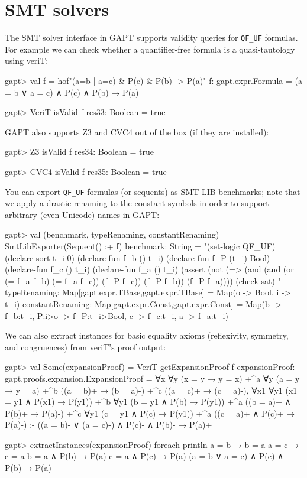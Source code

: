 \documentclass[a4paper,11pt]{book}
\begin{document}
\section{SMT solvers}

The SMT solver interface in GAPT supports validity queries for \verb,QF_UF,
formulas.  For example we can check whether a quantifier-free formula is a
quasi-tautology using veriT:
\begin{clilisting}
gapt> val f = hof"(a=b | a=c) & P(c) & P(b) -> P(a)"
f: gapt.expr.Formula = (a = b ∨ a = c) ∧ P(c) ∧ P(b) → P(a)

\end{clilisting}

\begin{clilisting}
gapt> VeriT isValid f
res33: Boolean = true

\end{clilisting}

GAPT also supports Z3 and CVC4 out of the box (if they are installed):
\begin{clilisting}
gapt> Z3 isValid f
res34: Boolean = true

gapt> CVC4 isValid f
res35: Boolean = true

\end{clilisting}

You can export \verb,QF_UF, formulas (or sequents) as SMT-LIB benchmarks;
note that we apply a drastic renaming to the constant symbols in order to
support arbitrary (even Unicode) names in GAPT:
\begin{clilisting}
gapt> val (benchmark, typeRenaming, constantRenaming) = SmtLibExporter(Sequent() :+ f)
benchmark: String =
"(set-logic QF_UF)
(declare-sort t_i 0)
(declare-fun f_b () t_i)
(declare-fun f_P (t_i) Bool)
(declare-fun f_c () t_i)
(declare-fun f_a () t_i)
(assert (not (=> (and (and (or (= f_a f_b) (= f_a f_c)) (f_P f_c)) (f_P f_b)) (f_P f_a))))
(check-sat)
"
typeRenaming: Map[gapt.expr.TBase,gapt.expr.TBase] = Map(o -> Bool, i -> t_i)
constantRenaming: Map[gapt.expr.Const,gapt.expr.Const] = Map(b -> f_b:t_i, P:i>o -> f_P:t_i>Bool, c -> f_c:t_i, a -> f_a:t_i)

\end{clilisting}

We can also extract instances for basic equality axioms (reflexivity, symmetry,
and congruences) from veriT's proof output:
\begin{clilisting}
gapt> val Some(expansionProof) = VeriT getExpansionProof f
expansionProof: gapt.proofs.expansion.ExpansionProof =
∀x ∀y (x = y → y = x)
  +^{a}
    ∀y (a = y → y = a)
    +^{b} ((a = b)+ → (b = a)-)
    +^{c} ((a = c)+ → (c = a)-),
∀x1 ∀y1 (x1 = y1 ∧ P(x1) → P(y1))
  +^{b} ∀y1 (b = y1 ∧ P(b) → P(y1)) +^{a} ((b = a)+ ∧ P(b)+ → P(a)-)
  +^{c} ∀y1 (c = y1 ∧ P(c) → P(y1)) +^{a} ((c = a)+ ∧ P(c)+ → P(a)-)
:-
((a = b)- ∨ (a = c)-) ∧ P(c)- ∧ P(b)- → P(a)+

gapt> extractInstances(expansionProof) foreach println
a = b → b = a
a = c → c = a
b = a ∧ P(b) → P(a)
c = a ∧ P(c) → P(a)
(a = b ∨ a = c) ∧ P(c) ∧ P(b) → P(a)

\end{clilisting}
\end{document}
